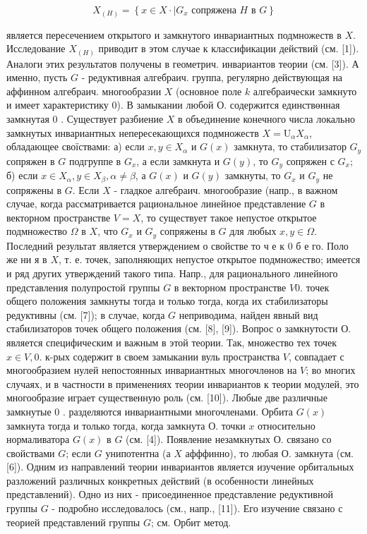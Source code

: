 \documentclass[10pt]{article}
\begin{document}
\[

X_{(H)}=\left\{x \in X \cdot \mid G_{x} \text { сопряжена } H \text { в } G\right\}

\]



является пересечением открытого и замкнутого инвариантных подмножеств в $X$. Исследование $X_{(H)}$ приводит в этом случае к классификации действий (см. [1]). Аналоги этих результатов получены в геометрич. инвариантов теории (см. [3]). А именно, пусть $G$ - редуктивная алгебраич. группа, регулярно действующая на аффинном алгебраич. многообразии $X$ (основное поле $k$ алгебраически замкнуто и имеет характеристику 0). В замыкании любой О. содержится единствөнная замкнутая 0 . Существует разбиение $X$ в объединение конечного числа локально замкнутых инвариантных непересекающихся подмножеств $X=\mathrm{U}_{\alpha} X_{\alpha}$, обладающее своїствами: а) если $x, y \in X_{\alpha}$ и $G(x)$ замкнута, то стабилизатор $G_{y}$ сопряжен в $G$ подгруппе в $G_{x}$, а если замкнута и $G(y)$, то $G_{y}$ сопряжен с $G_{x} ;$ б) если $x \in X_{\alpha}, y \in X_{\beta}, \alpha \neq \beta$, а $G(x)$ и $G(y)$ замкнуты, то $G_{x}$ и $G_{y}$ не сопряжены в $G$. Если $X$ - гладкое алгебраич. многообразие (напр., в важном случае, когда рассматривается рациональное линейное представление $G$ в векторном пространстве $V=X$, то существует такое непустое открытое подмножество $\Omega$ в $X$, что $G_{x}$ и $G_{y}$ сопряжены в $G$ для любых $x, y \in \Omega$. Последний результат является утверждением о свойстве то ч е к 0 б $е$ го. Поло же ни я в $X$, т. е. точек, заполняющих непустое открытое подмножество; имеется и ряд других утверждений такого типа. Напр., для рационального линейного представления полупростой группы $G$ в векторном пространстве $V 0$. точек общего положения замкнуты тогда и только тогда, когда их стабилизаторы редуктивны (см. [7]); в случае, когда $G$ неприводима, найден явный вид стабилизаторов точек общего положения (см. [8], [9]). Вопрос о замкнутости О. является специфическим и важным в этой теории. Так, множество тех точек $x \in V, 0$. к-рых содержит в своем замыкании вуль пространства $V$, совпадает с многообразием нулей непостоянных инвариантных многочлөнов на $V$; во многих случаях, и в частности в применениях теории инвариантов к теории модулей, это многообразие играет существенную роль (см. [10]). Любые две различные замкнутые 0 . разделяются инвариантными многочленами. Орбита $G(x)$ замкнута тогда и только тогда, когда замкнута О. точки $x$ относительно нормаливатора $G(x)$ в $G$ (см. [4]). Появление незамкнутых О. связано со свойствами $G$; если $G$ унипотентна (а $X$ афффинно), то любая О. замкнута (см. [6]). Одним из направлений теории инвариантов является изучение орбитальных разложений различных конкретных действий (в особенности линейных представлений). Одно из них - присоединенное представление редуктивной группы $G$ - подробно исследовалось (см., напр., [11]). Его изучение связано с теорией представлений группы $G$; см. Орбит метод.
\end{document}
